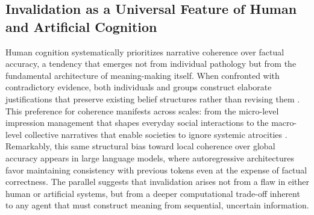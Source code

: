 \documentclass[12pt]{article}
\theoremstyle{definition}
\begin{document}
\subsection{Invalidation as a Universal Feature of Human and Artificial Cognition}
\label{sec:invalidity-human}


Human cognition systematically prioritizes narrative coherence over factual accuracy, a tendency that emerges not from individual pathology but from the fundamental architecture of meaning-making itself. When confronted with contradictory evidence, both individuals and groups construct elaborate justifications that preserve existing belief structures rather than revising them \parencite{festinger1957cognitive, cohen2001states}. This preference for coherence manifests across scales: from the micro-level impression management that shapes everyday social interactions \parencite{goffman1959presentation} to the macro-level collective narratives that enable societies to ignore systemic atrocities \parencite{cohen2001states}. Remarkably, this same structural bias toward local coherence over global accuracy appears in large language models, where autoregressive architectures favor maintaining consistency with previous tokens even at the expense of factual correctness. The parallel suggests that invalidation arises not from a flaw in either human or artificial systems, but from a deeper computational trade-off inherent to any agent that must construct meaning from sequential, uncertain information.
\end{document}
